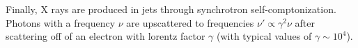 \documentclass[10pt]{article}
\numberwithin{equation}{section}
\newcommand{\n}{\noindent}
\begin{document}
	\n Finally, X rays are produced in jets through synchrotron self-comptonization. Photons with a frequency $\nu$ are upscattered to frequencies $\nu' \propto \gamma^2\nu$ after scattering off of an electron with lorentz factor $\gamma$ (with typical values of $\gamma\sim 10^4$).
\end{document}
